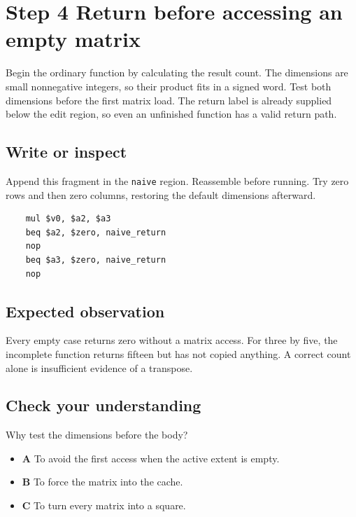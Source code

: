 \section{Step 4 Return before accessing an empty matrix}\label{transpose-s04}

Begin the ordinary function by calculating the result count. The dimensions are small nonnegative integers, so their product fits in a signed word. Test both dimensions before the first matrix load. The return label is already supplied below the edit region, so even an unfinished function has a valid return path.

\subsection{Write or inspect}
Append this fragment in the \texttt{naive} region. Reassemble before running. Try zero rows and then zero columns, restoring the default dimensions afterward.

\begin{verbatim}
    mul $v0, $a2, $a3
    beq $a2, $zero, naive_return
    nop
    beq $a3, $zero, naive_return
    nop
\end{verbatim}

\subsection{Expected observation}
Every empty case returns zero without a matrix access. For three by five, the incomplete function returns fifteen but has not copied anything. A correct count alone is insufficient evidence of a transpose.

\subsection{Check your understanding}
Why test the dimensions before the body?

\begin{itemize}
  \item \textbf{A} To avoid the first access when the active extent is empty.
  \item \textbf{B} To force the matrix into the cache.
  \item \textbf{C} To turn every matrix into a square.
\end{itemize}
